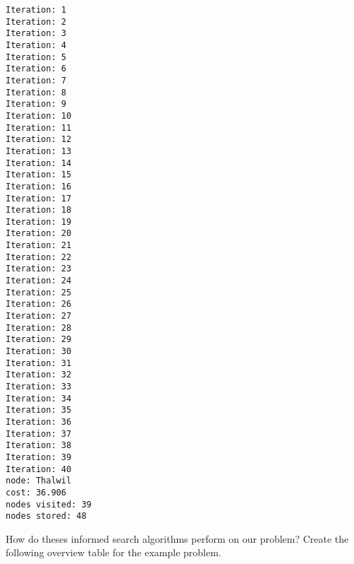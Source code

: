 \documentclass[11pt]{article}
\begin{document}
    \begin{Verbatim}[commandchars=\\\{\}]
Iteration: 1
Iteration: 2
Iteration: 3
Iteration: 4
Iteration: 5
Iteration: 6
Iteration: 7
Iteration: 8
Iteration: 9
Iteration: 10
Iteration: 11
Iteration: 12
Iteration: 13
Iteration: 14
Iteration: 15
Iteration: 16
Iteration: 17
Iteration: 18
Iteration: 19
Iteration: 20
Iteration: 21
Iteration: 22
Iteration: 23
Iteration: 24
Iteration: 25
Iteration: 26
Iteration: 27
Iteration: 28
Iteration: 29
Iteration: 30
Iteration: 31
Iteration: 32
Iteration: 33
Iteration: 34
Iteration: 35
Iteration: 36
Iteration: 37
Iteration: 38
Iteration: 39
Iteration: 40
node: Thalwil
cost: 36.906
nodes visited: 39
nodes stored: 48

    \end{Verbatim}

    How do theses informed search algorithms perform on our problem? Create
the following overview table for the example problem.
\end{document}
